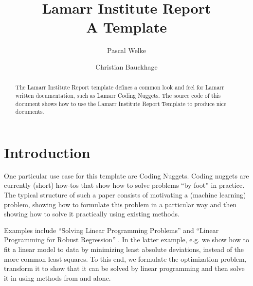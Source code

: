 \documentclass[fleqn,svgnames]{lamarrreport}
\begin{document}


\title[Linear Programming for Robust Regression]{Lamarr Institute Report \\ A Template}


\author[P. Welke]{Pascal Welke}

\author[C. Bauckhage]{Christian Bauckhage}

\begin{abstract}
The Lamarr Institute Report template defines a common look and feel for Lamarr written documentation, such as Lamarr Coding Nuggets. 
The source code of this document shows how to use the Lamarr Institute Report Template to produce nice documents.
\end{abstract}

\maketitle



\section{Introduction}

One particular use case for this template are Coding Nuggets.
Coding nuggets are currently (short) how-tos that show how to solve problems ``by foot'' in practice.
The typical structure of such a paper consists of motivating a (machine learning) problem, showing how to formulate this problem in a particular way and then showing how to solve it practically using existing methods. 

Examples include  ``Solving Linear Programming Problems'' \cite{Welke2020-SLP} and ``Linear Programming for Robust Regression'' \cite{Welke2020-SLP2}.
In the latter example, e.g. we show how to fit a linear model to data by minimizing least absolute deviations, instead of the more common least squares. 
To this end, we formulate the optimization problem, transform it to show that it can be solved by linear programming and then solve it in  using methods from  and  alone.  
\end{document}
